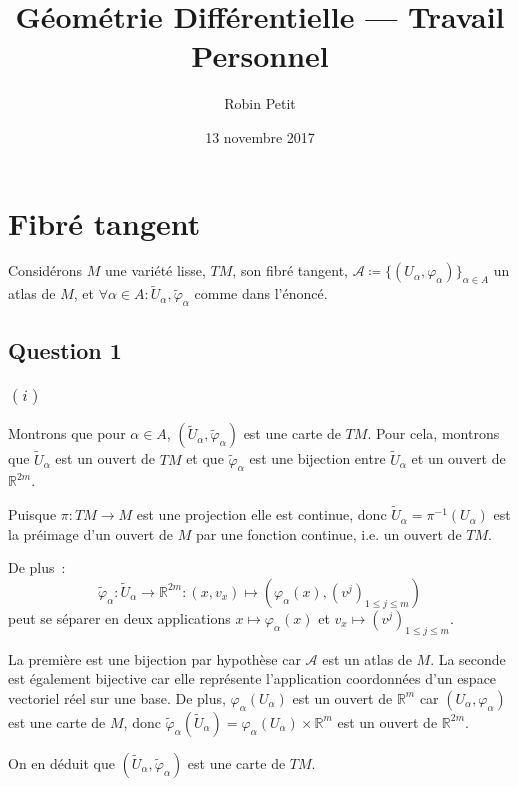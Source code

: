 \documentclass{article}
\title{Géométrie Différentielle --- Travail Personnel}
\author{Robin Petit}
\date{13 novembre 2017}
\newcommand{\R}{\mathbb R}
\begin{document}
\maketitle

\section{Fibré tangent}

Considérons $M$ une variété lisse, $TM$, son fibré tangent, $\mathcal A \coloneqq \{(U_\alpha, \varphi_\alpha)\}_{\alpha \in A}$
un atlas de $M$, et $\forall \alpha \in A : \widetilde U_\alpha, \widetilde \varphi_\alpha$ comme dans l'énoncé.

\subsection*{Question 1}


\subsubsection*{$(i)$}
Montrons que pour $\alpha \in A$, $(\widetilde U_\alpha, \widetilde \varphi_\alpha)$ est une carte de $TM$. Pour cela, montrons
que $\widetilde U_\alpha$ est un ouvert de $TM$ et que $\widetilde \varphi_\alpha$ est une bijection entre $\widetilde U_\alpha$
et un ouvert de $\R^{2m}$.

Puisque $\pi : TM \to M$ est une projection elle est continue, donc $\widetilde U_\alpha = \pi^{-1}(U_\alpha)$ est la préimage
d'un ouvert de $M$ par une fonction continue, i.e. un ouvert de $TM$.

De plus~:
\[\widetilde \varphi_\alpha : \widetilde U_\alpha \to \R^{2m} : (x, v_x) \mapsto \left(\varphi_\alpha(x), \left(v^j\right)_{1 \leq j \leq m}\right)\]
peut se séparer en deux applications $x \mapsto \varphi_\alpha(x)$ et $v_x \mapsto (v^j)_{1 \leq j \leq m}$.

La première est une bijection par hypothèse car $\mathcal A$ est un atlas de $M$. La seconde est également bijective car elle
représente l'application coordonnées d'un espace vectoriel réel sur une base. De plus, $\varphi_\alpha(U_\alpha)$ est un ouvert de $\R^m$
car $(U_\alpha, \varphi_\alpha)$ est une carte de $M$, donc $\widetilde \varphi_\alpha(\widetilde U_\alpha) = \varphi_\alpha(U_\alpha) \times \R^m$
est un ouvert de $\R^{2m}$.

On en déduit que $(\widetilde U_\alpha, \widetilde \varphi_\alpha)$ est une carte de $TM$.
\end{document}
